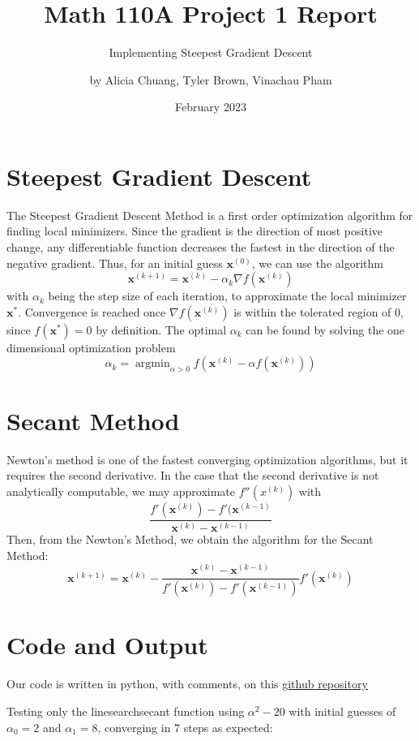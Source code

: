 \documentclass{article}
\title{Math 110A Project 1 Report}
\subtitle{Implementing Steepest Gradient Descent}
\author{by Alicia Chuang, Tyler Brown, Vinachau Pham}
\date{February 2023}
\DeclareMathOperator*{\argmin}{argmin}
\begin{document}
\maketitle

\section{Steepest Gradient Descent}
The Steepest Gradient Descent Method is a first order optimization algorithm for finding local minimizers. Since the gradient is the direction of most positive change, any differentiable function decreases the fastest in the direction of the negative gradient. Thus, for an initial guess $\textbf{x}^{(0)}$, we can use the algorithm \[\textbf{x}^{(k+1)} = \textbf{x}^{(k)} - \alpha_k \nabla f(\textbf{x}^{(k)})\]
with $\alpha_k$ being the step size of each iteration, to approximate the local minimizer $\textbf{x}^{*}$. Convergence is reached once $\nabla f(\textbf{x}^{(k)})$ is within the tolerated region of 0, since $f(\textbf{x}^{*})=0$ by definition. The optimal $\alpha_k$ can be found by solving the one dimensional optimization problem \[\alpha_k = \argmin_{\alpha>0}f(\textbf{x}^{(k)}-\alpha f(\textbf{x}^{(k)}))\]

\section{Secant Method}
Newton's method is one of the fastest converging optimization algorithms, but it requires the second derivative. In the case that the second derivative is not analytically computable, we may approximate $f''(x^{(k)})$ with \[\frac{f'(\textbf{x}^{(k)})-f'(\textbf{x}^{(k-1)}}{\textbf{x}^{(k)}-\textbf{x}^{(k-1)}}\]
Then, from the Newton's Method, we obtain the algorithm for the Secant Method: \[\textbf{x}^{(k+1)} = \textbf{x}^{(k)} - \frac{\textbf{x}^{(k)}-\textbf{x}^{(k-1)}}{f'(\textbf{x}^{(k)})-f'(\textbf{x}^{(k-1)})}f'(\textbf{x}^{(k)})\]


\section{Code and Output}
Our code is written in python, with comments, on this \href{https://github.com/AliciaChuang/MATH-110A-Project-1/blob/main/project.py}{github repository}
\bigskip

Testing only the linesearch\textunderscore secant function using $\alpha^2 - 20$ with initial guesses of $\alpha_0 = 2$ and $\alpha_1 = 8$, converging in 7 steps as expected:
\bigskip
\end{document}
